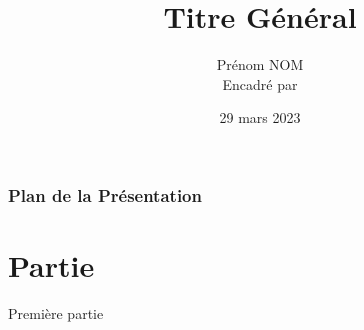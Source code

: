 \documentclass [xcolor=x11names,t] {beamer}
\title[Titre résumé]{Titre Général}
\institute[]{Département de Mathématiques \\Université Paris-Saclay}
\author[Nom, Nom]{
	Prénom NOM
	\\Encadré par }
\date{29 mars 2023}
\begin{document}
\begin{frame}
\maketitle
\end{frame}

\begin{frame}
\frametitle{Plan de la Présentation}
\setcounter{tocdepth}{2}
\tableofcontents
\end{frame}


\section{Partie}
\begin{frame}{Première partie}
    
\end{frame}
\end{document}
